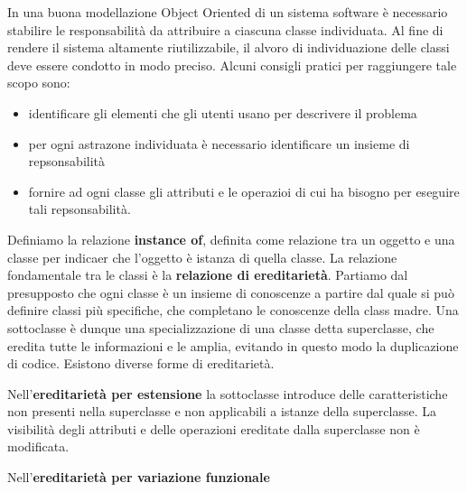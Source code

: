 \documentclass[a4paper,18pt]{extarticle}
\begin{document}
In una buona modellazione Object Oriented di un sistema software è necessario stabilire le responsabilità da attribuire a ciascuna classe individuata. Al fine di rendere il sistema altamente riutilizzabile, il alvoro di individuazione delle classi deve essere condotto in modo preciso. Alcuni consigli pratici per raggiungere tale scopo sono:
\begin{itemize}
    \item identificare gli elementi che gli utenti usano per descrivere il problema
    \item per ogni astrazone individuata è necessario identificare un insieme di repsonsabilità
    \item fornire ad ogni classe gli attributi e le operazioi di cui ha bisogno per eseguire tali repsonsabilità.
\end{itemize}

Definiamo la relazione \textbf{instance of}, definita come relazione tra un oggetto e una classe per indicaer che l'oggetto è istanza di quella classe. La relazione fondamentale tra le classi è la \textbf{relazione di ereditarietà}. Partiamo dal presupposto che ogni classe è un insieme di conoscenze a partire dal quale si può definire classi più specifiche, che completano le conoscenze della class madre. Una sottoclasse è dunque una specializzazione di una classe detta superclasse, che eredita tutte le informazioni e le amplia, evitando in questo modo la duplicazione di codice. Esistono diverse forme di ereditarietà.

Nell'\textbf{ereditarietà per estensione} la sottoclasse introduce delle caratteristiche non presenti nella superclasse e non applicabili a istanze della superclasse. La visibilità degli attributi e delle operazioni ereditate dalla superclasse non è modificata.

Nell'\textbf{ereditarietà per variazione funzionale}
\end{document}
